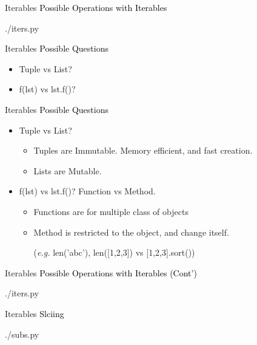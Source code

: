\documentclass{beamer}
\begin{document}
\begin{frame}{Iterables}
  \textcolor{black}{\large{Possible Operations with Iterables}}
  \begin{lstinputlisting}[firstline=5, lastline=18]
    {./iters.py}
  \end{lstinputlisting}
\end{frame}

\begin{frame}{Iterables}
  \textcolor{black}{\large{Possible Questions}}
  \begin{itemize}
    \item Tuple vs List?
    \item f(lst) vs lst.f()?
  \end{itemize}
\end{frame}

\begin{frame}{Iterables}
  \textcolor{black}{\large{Possible Questions}}
  \begin{itemize}
    \item Tuple vs List?
      \begin{itemize}
        \item Tuples are Immutable. Memory efficient, and fast creation.
        \item Lists are Mutable.
      \end{itemize}

    \item f(lst) vs lst.f()?
      Function vs Method. 
      \begin{itemize}
        \item Functions are for multiple class of objects
        \item Method is restricted to the object, and change itself. 
          
          (\textit{e.g.} len('abc'), len([1,2,3]) vs [1,2,3].sort())
      \end{itemize}
  \end{itemize}
\end{frame}

\begin{frame}{Iterables}
  \textcolor{black}{\large{Possible Operations with Iterables (Cont')}}
  \begin{lstinputlisting}[firstline=19, lastline=31]
    {./iters.py}
  \end{lstinputlisting}
\end{frame}

\begin{frame}{Iterables}
  \textcolor{black}{\large{Slciing}}
  \begin{lstinputlisting}
    {./subs.py}
  \end{lstinputlisting}
\end{frame}
\end{document}
